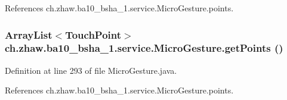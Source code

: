 References ch.zhaw.ba10\_\-bsha\_\-1.service.MicroGesture.points.\hypertarget{classch_1_1zhaw_1_1ba10__bsha__1_1_1service_1_1MicroGesture_a919d77a82938af887cff893c7b0f41e5}{
\subsubsection[{getPoints}]{\setlength{\rightskip}{0pt plus 5cm}ArrayList$<${\bf TouchPoint}$>$ ch.zhaw.ba10\_\-bsha\_\-1.service.MicroGesture.getPoints ()}}
\label{classch_1_1zhaw_1_1ba10__bsha__1_1_1service_1_1MicroGesture_a919d77a82938af887cff893c7b0f41e5}


Definition at line 293 of file MicroGesture.java.

References ch.zhaw.ba10\_\-bsha\_\-1.service.MicroGesture.points.

